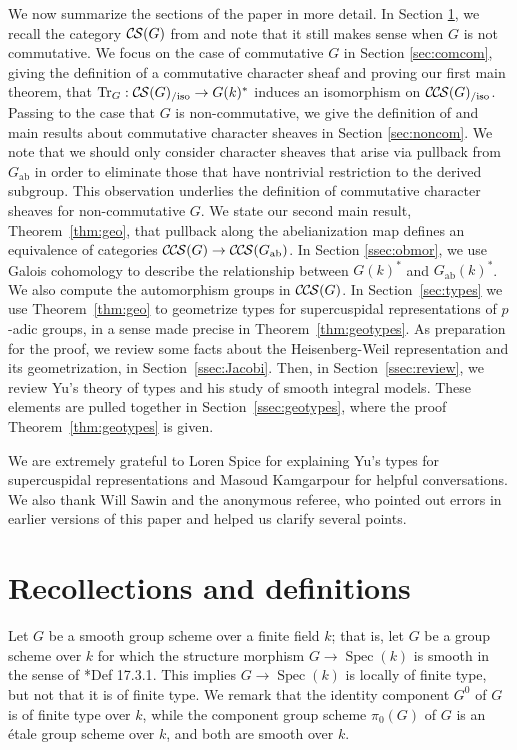 \documentclass[10pt]{amsart}
\theoremstyle{plain}
\theoremstyle{definition}
\newcommand{\Fq}{k}
\newcommand{\Spec}[1]{{\operatorname{Spec}(#1)}}
\newcommand{\ab}{_{\operatorname{ab}}}
\DeclareMathOperator{\Tr}{Tr}
\newcommand{\TrFrob}[1]{\Tr_{#1}}
\newcommand{\CS}{{\mathcal{C\hskip-0.8pt S}}}
\newcommand{\CCS}{{\mathcal{C\hskip-.8pt C\hskip-0.8pt S}}}
\newcommand{\CSiso}[1]{\CS(#1)_{/\text{iso}}}
\newcommand{\CCSiso}[1]{\CCS(#1)_{/\text{iso}}}
\begin{document}
We now summarize the sections of the paper in more detail.
In Section \ref{sec:defs}, we recall the category $\CS(G)$ from \cite{cunningham-roe:13a} and note that it still makes sense when $G$ is not commutative.  
We focus on the case of commutative $G$ in Section \ref{sec:comcom},
giving the definition of a commutative character sheaf and proving our first main theorem, that
$\TrFrob{G} : \CSiso{G} \to G(k)^*$ induces an isomorphism on $\CCSiso{G}$.
Passing to the case that $G$ is non-commutative, we give the definition of and main results about commutative character sheaves in Section \ref{sec:noncom}.  
We note that we should only consider character sheaves that arise via pullback from $G\ab$ in order to eliminate those that have nontrivial restriction to the derived subgroup.  
This observation underlies the definition of commutative character sheaves for non-commutative $G$.  
We state our second main result, Theorem~\ref{thm:geo}, that pullback along the abelianization map defines an equivalence of categories $\CCS(G) \to \CCS(G\ab)$.
In Section \ref{ssec:obmor}, we use Galois cohomology to describe the relationship between $G(k)^*$ and $G\ab(k)^*$.  
We also compute the automorphism groups in $\CCS(G)$.
In Section~\ref{sec:types} we use Theorem~\ref{thm:geo} to geometrize types for supercuspidal representations of $p$-adic groups, in a sense made precise in Theorem~\ref{thm:geotypes}.
As preparation for the proof, we review some facts about the Heisenberg-Weil representation and its geometrization, in Section~\ref{ssec:Jacobi}.
Then, in Section~\ref{ssec:review}, we review Yu's theory of types and his study of smooth integral models.  
These elements are pulled together in Section~\ref{ssec:geotypes}, where the proof Theorem~\ref{thm:geotypes} is given.



\bigskip

We are extremely grateful to Loren Spice for explaining Yu's types for supercuspidal representations and Masoud Kamgarpour for helpful conversations.
We also thank Will Sawin and the anonymous referee, who pointed out errors in earlier versions of this paper and helped us clarify several points.

\section{Recollections and definitions} \label{sec:defs}

Let $G$ be a smooth group scheme over a finite field $\Fq$; that is, let $G$ be a group scheme over $\Fq$
for which the structure morphism $G \to \Spec{\Fq}$ is smooth in the sense of \cite{EGAIV4}*{Def 17.3.1}.
This implies $G \to \Spec{\Fq}$ is locally of finite type, but not that it is of finite type.
We remark that the identity component $G^0$ of $G$ is of finite type over $\Fq$, while the component group scheme
$\pi_0(G)$ of $G$ is an \'etale group scheme over $\Fq$, and both are smooth over $\Fq$.
\end{document}
